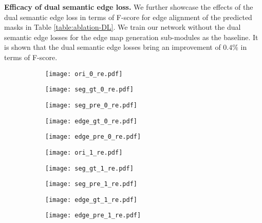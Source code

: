 \documentclass[runningheads]{llncs}
\begin{document}
\smallskip \noindent \textbf{Efficacy of dual semantic edge loss.}
We further showcase the effect{s} of the dual semantic edge loss in terms of F-score for edge alignment of the predicted {\SemSegPoint} masks in Table \ref{table:ablation-DL}. We train our network {without} 
the dual semantic edge losses {for}
the edge map generation sub-modules as the baseline. It is shown that the dual semantic edge losses bring an improvement of {$0.4\%$} in terms of F-score.



\begin{figure}
\captionsetup[subfigure]{labelformat=empty}
\begin{subfigure}{.193\textwidth}
  \centering
  \texttt{[image: ori\_0\_re.pdf]}
\end{subfigure} \hfil
\begin{subfigure}{.193\textwidth}
  \centering
  \texttt{[image: seg\_gt\_0\_re.pdf]}
\end{subfigure} \hfil
\begin{subfigure}{.193\textwidth}
  \centering
  \texttt{[image: seg\_pre\_0\_re.pdf]}
\end{subfigure} \hfil
\begin{subfigure}{.193\textwidth}
  \centering
  \texttt{[image: edge\_gt\_0\_re.pdf]}
\end{subfigure} \hfil
\begin{subfigure}{.193\textwidth}
  \centering
  \texttt{[image: edge\_pre\_0\_re.pdf]}
\end{subfigure}

\begin{subfigure}{.193\textwidth}
  \centering
  \texttt{[image: ori\_1\_re.pdf]}
\end{subfigure} \hfil
\begin{subfigure}{.193\textwidth}
  \centering
  \texttt{[image: seg\_gt\_1\_re.pdf]}
\end{subfigure} \hfil
\begin{subfigure}{.193\textwidth}
  \centering
  \texttt{[image: seg\_pre\_1\_re.pdf]}
\end{subfigure} \hfil
\begin{subfigure}{.193\textwidth}
  \centering
  \texttt{[image: edge\_gt\_1\_re.pdf]}
\end{subfigure} \hfil
\begin{subfigure}{.193\textwidth}
  \centering
  \texttt{[image: edge\_pre\_1\_re.pdf]}
\end{subfigure}


\end{figure}
\end{document}

